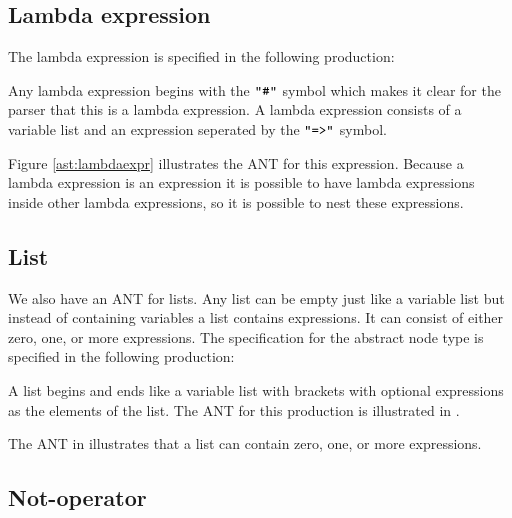 

\subsection{Lambda expression}

The lambda expression is specified in the following production:

\begin{ebnf}
\end{ebnf}

Any lambda expression begins with the $\texttt{"\#"}$ symbol which makes it clear for the
parser that this is a lambda expression. A lambda expression consists of a
variable list and an expression seperated by the $\texttt{"=>"}$ symbol.



Figure \ref{ast:lambdaexpr} illustrates the ANT for this expression. Because a
lambda expression is an expression it is possible to have lambda expressions
inside other lambda expressions, so it is possible to nest these expressions.

\subsection{List}

We also have an ANT for lists. Any list can be empty
just like a variable list but instead of containing variables a list contains
expressions. It can consist of either zero, one, or more expressions. The
specification for the abstract node type is specified in the following
production:

\begin{ebnf}
\end{ebnf}

A list begins and ends like a variable list with brackets with optional
expressions as the elements of the list. The ANT for this production is illustrated
in .



The ANT in  illustrates that a list can contain zero, one, or
more expressions.

\subsection{Not-operator}

